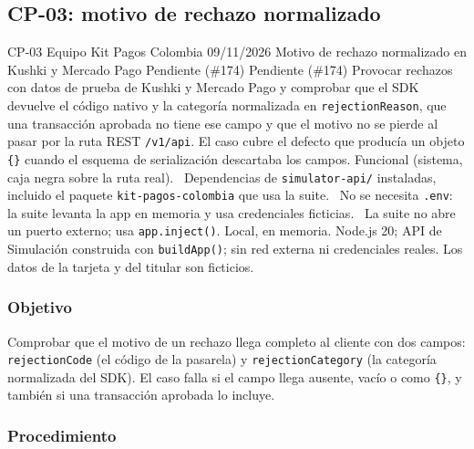 \subsection{CP-03: motivo de rechazo normalizado}
\label{anexo:cp03}

\FichaCaso
  {CP-03}
  {Equipo Kit Pagos Colombia}
  {09/11/2026}
  {Motivo de rechazo normalizado en Kushki y Mercado Pago}
  {Pendiente (\#174)}
  {Pendiente (\#174)}
  {Provocar rechazos con datos de prueba de Kushki y Mercado Pago y comprobar que el SDK devuelve el código nativo y la categoría normalizada en \texttt{rejectionReason}, que una transacción aprobada no tiene ese campo y que el motivo no se pierde al pasar por la ruta REST \texttt{/v1/api}. El caso cubre el defecto que producía un objeto \texttt{\{\}} cuando el esquema de serialización descartaba los campos.}
  {Funcional (sistema, caja negra sobre la ruta real).}
  {\textbullet\ Dependencias de \texttt{simulator-api/} instaladas, incluido el paquete \texttt{kit-pagos-colombia} que usa la suite.\newline
   \textbullet\ No se necesita \texttt{.env}: la suite levanta la app en memoria y usa credenciales ficticias.\newline
   \textbullet\ La suite no abre un puerto externo; usa \texttt{app.inject()}.}
  {Local, en memoria. Node.js 20; API de Simulación construida con \texttt{buildApp()}; sin red externa ni credenciales reales. Los datos de la tarjeta y del titular son ficticios.}

\subsubsection{Objetivo}

Comprobar que el motivo de un rechazo llega completo al cliente con dos campos: \texttt{rejectionCode} (el código de la pasarela) y \texttt{rejectionCategory} (la categoría normalizada del SDK). El caso falla si el campo llega ausente, vacío o como \texttt{\{\}}, y también si una transacción aprobada lo incluye.

\subsubsection{Procedimiento}

